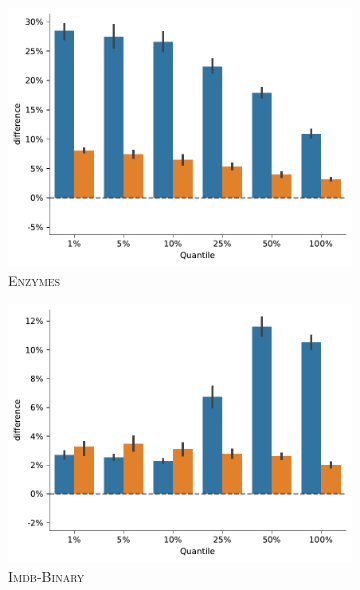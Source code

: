 \begin{figure}[H]
	\begin{subfigure}[b]{0.3\textwidth}
		\centering
		\includegraphics[width=\textwidth]{Figures/train_test_diff_ENZYMES.pdf}
		\vspace*{-4ex} 
		\caption{\textsc{Enzymes}}
	\end{subfigure}
	\hfill
	\begin{subfigure}[b]{0.3\textwidth}
		\centering
		\includegraphics[width=\textwidth]{Figures/train_test_diff_IMDB-BINARY.pdf}
		\vspace*{-4ex} 
		\caption{\textsc{Imdb-Binary}}
	\end{subfigure}
	\hfill
	\begin{subfigure}[b]{0.3\textwidth}

\end{subfigure}
\end{figure}
